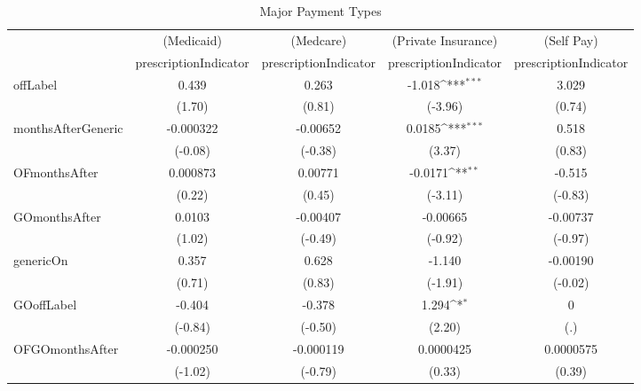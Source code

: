 \begin{table}[htbp]\centering
\def\sym#1{\ifmmode^{#1}\else\(^{#1}\)\fi}
\caption{Major Payment Types\label{tab1}}
\begin{tabular}{l*{4}{c}}
\hline\hline
            &\multicolumn{1}{c}{(Medicaid)}&\multicolumn{1}{c}{(Medcare)}&\multicolumn{1}{c}{(Private Insurance)}&\multicolumn{1}{c}{(Self Pay)}\\
            &\multicolumn{1}{c}{prescriptionIndicator}&\multicolumn{1}{c}{prescriptionIndicator}&\multicolumn{1}{c}{prescriptionIndicator}&\multicolumn{1}{c}{prescriptionIndicator}\\
\hline
offLabel    &       0.439         &       0.263         &      -1.018\sym{***}&       3.029         \\
            &      (1.70)         &      (0.81)         &     (-3.96)         &      (0.74)         \\
[1em]
monthsAfterGeneric&   -0.000322         &    -0.00652         &      0.0185\sym{***}&       0.518         \\
            &     (-0.08)         &     (-0.38)         &      (3.37)         &      (0.83)         \\
[1em]
OFmonthsAfter&    0.000873         &     0.00771         &     -0.0171\sym{**} &      -0.515         \\
            &      (0.22)         &      (0.45)         &     (-3.11)         &     (-0.83)         \\
[1em]
GOmonthsAfter&      0.0103         &    -0.00407         &    -0.00665         &    -0.00737         \\
            &      (1.02)         &     (-0.49)         &     (-0.92)         &     (-0.97)         \\
[1em]
genericOn   &       0.357         &       0.628         &      -1.140         &    -0.00190         \\
            &      (0.71)         &      (0.83)         &     (-1.91)         &     (-0.02)         \\
[1em]
GOoffLabel  &      -0.404         &      -0.378         &       1.294\sym{*}  &           0         \\
            &     (-0.84)         &     (-0.50)         &      (2.20)         &         (.)         \\
[1em]
OFGOmonthsAfter&   -0.000250         &   -0.000119         &   0.0000425         &   0.0000575         \\
            &     (-1.02)         &     (-0.79)         &      (0.33)         &      (0.39)         \\

\end{tabular}
\end{table}
